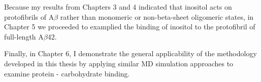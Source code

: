 Because my results from Chapters 3 and 4 indicated that inositol acts on protofibrils of A$\beta$ rather than monomeric or non-beta-sheet oligomeric states, in Chapter 5 we proceeded to examplied the binding of inositol to the protofibril of full-length A$\beta$42.

Finally, in Chapter 6, I demonstrate the general applicability of the methodology developed in this thesis by applying similar MD simulation approaches to examine protein - carbohydrate binding. 


\begin{singlespace}


\end{singlespace}

%


%
%

